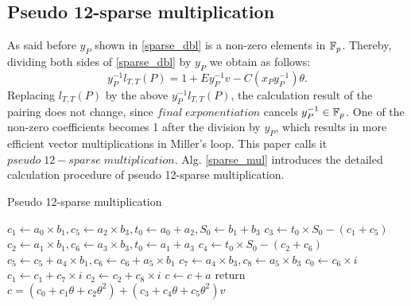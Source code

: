 \subsection{Pseudo 12-sparse multiplication}
As said before $y_P$ shown in \eqref{sparse_dbl} is a non-zero elements in ${\mathbb{F}}_{p}$. Thereby, dividing both sides of \eqref{sparse_dbl} by $y_P$ we obtain as follows:
\begin{equation}\label{line_2}
	y_P^{-1}l_{T,T}(P)=1+Ey_P^{-1}v-C(x_Py_P^{-1})\theta.
\end{equation}
Replacing $l_{T,T}(P)$ by the above $y_P^{-1}l_{T,T}(P)$, the calculation result of the pairing does not change, since  $final\;exponentiation$ cancels $y_P^{-1}\in {\mathbb{F}}_{p}$. One of the non-zero coefficients becomes 1 after the division by $y_P$, which results in more efficient vector multiplications in Miller's loop. This paper calls it $pseudo\;12-sparse\;multiplication$. Alg. \ref{sparse_mul}  introduces the detailed calculation procedure of pseudo 12-sparse multiplication.
\begin{algorithm}[htbp]
	\caption{Pseudo 12-sparse multiplication}
	\label{sparse_mul}
	\DontPrintSemicolon

	\hspace{-3ex}
	\hspace{-3ex}
	\nl $c_1\leftarrow a_0\times b_1,c_5\leftarrow a_2\times b_3,t_0\leftarrow a_0+a_2,S_0\leftarrow b_1+b_3$\;
	\nl $c_3\leftarrow t_0\times S_0-(c_1+c_5)$\;
	\nl $c_2\leftarrow a_1\times b_1,c_6\leftarrow a_3\times b_3,t_0\leftarrow a_1+a_3$\;
	\nl $c_4\leftarrow t_0\times S_0-(c_2+c_6)$\;
	\nl $c_5\leftarrow c_5+a_4\times b_1,c_6\leftarrow c_6+a_5\times b_1$\;
	\nl $c_7\leftarrow a_4\times b_3,c_8\leftarrow a_5\times b_3$\;
	\nl $c_0\leftarrow c_6\times i$\;
	\nl $c_1\leftarrow c_1+c_7\times i$\;
	\nl $c_2\leftarrow c_2+c_8\times i$\;
	\nl $c\leftarrow c+a$\;
	\nl return $c=(c_0+c_1\theta+c_2\theta^2)+(c_3+c_4\theta+c_5\theta^2)v$
\end{algorithm}
\vspace{-0.6em}

